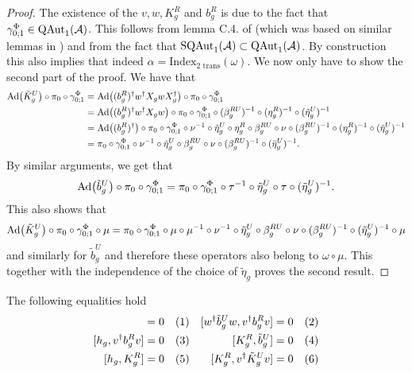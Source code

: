 \documentclass[11pt,a4paper,twoside]{article}
\numberwithin{equation}{section}
\begin{document}
	\begin{proof}
		The existence of the $v,w,K_g^R$ and $b_g^R$ is due to the fact that $\gamma^\Phi_{0;1}\in \QAut{\AA}$. This follows from lemma C.4. of \cite{jappens2023spt} (which was based on similar lemmas in \cite{ogata2021h3gmathbb}) and from the fact that $\textrm{SQAut}_1(\AA)\subset \QAut{\AA}$. By construction this also implies that indeed $\alpha=\textrm{Index}_{\text{2 trans}}(\omega)$. We now only have to show the second part of the proof. We have that
		\begin{align}
			\Ad{\tilde{K}_g^U}\circ\pi_0\circ\gamma^\Phi_{0;1}&=\Ad{(b_g^R)^\dagger w^\dagger X_g w X_g^\dagger}\circ\pi_0\circ\gamma^\Phi_{0;1}\\
			&=\Ad{(b_g^R)^\dagger w^\dagger X_g w}\circ\pi_0\circ\gamma^\Phi_{0;1}\circ(\beta_g^{RU})^{-1}\circ(\eta_g^R)^{-1}\circ(\tilde{\eta}_g^U)^{-1}\\
			&=\Ad{(b_g^R)^\dagger}\circ\pi_0\circ\gamma^\Phi_{0;1}\circ\nu^{-1}\circ\tilde{\eta}_g^U\circ\eta_g^R\circ\beta_g^{RU}\circ\nu\circ(\beta_g^{RU})^{-1}\circ(\eta_g^R)^{-1}\circ(\tilde{\eta}_g^U)^{-1}\\
			&=\pi_0\circ\gamma^\Phi_{0;1}\circ\nu^{-1}\circ\tilde{\eta}_g^U\circ\beta_g^{RU}\circ\nu\circ(\beta_g^{RU})^{-1}\circ(\tilde{\eta}_g^U)^{-1}.
		\end{align}
		By similar arguments, we get that
		\begin{equation}
			\Ad{\tilde{b}_g^U}\circ\pi_0\circ\gamma^\Phi_{0;1}=\pi_0\circ\gamma^\Phi_{0;1}\circ\tau^{-1}\circ\tilde{\eta}_g^U\circ\tau\circ(\tilde{\eta}_g^U)^{-1}.
		\end{equation}
		This also shows that
		\begin{equation}
			\Ad{\tilde{K}_g^U}\circ\pi_0\circ\gamma^\Phi_{0;1}\circ\mu=\pi_0\circ\gamma^\Phi_{0;1}\circ\mu\circ\mu^{-1}\circ\nu^{-1}\circ\tilde{\eta}_g^U\circ\beta_g^{RU}\circ\nu\circ(\beta_g^{RU})^{-1}\circ(\tilde{\eta}_g^U)^{-1}\circ\mu
		\end{equation}
		and similarly for $\tilde{b}_g^U$ and therefore these operators also belong to $\omega\circ\mu$. This together with the independence of the choice of $\tilde{\eta}_g$ proves the second result.
	\end{proof}
	\begin{lemma}
		The following equalities hold
		\begin{align*}
			[h_g ,w^\dagger \tilde{b}_g^U w]&=0 \Label{eq:H^1IndexRotationInvariantCommutator1}& [w^\dagger \tilde{b}_g^U w,v^\dagger b_g^R v]&=0 \Label{eq:H^1IndexRotationInvariantCommutator4}\\
			[h_g, v^\dagger b_g^R v]&=0 \Label{eq:H^1IndexRotationInvariantCommutator2}& [K_g^R,\tilde{b}_g^U] &= 0 \Label{eq:H^1IndexRotationInvariantCommutator5}\\
			[h_g ,K_g^R]&=0 \Label{eq:H^1IndexRotationInvariantCommutator3}& [K_g^R,v^\dagger \tilde{K}^U_g v] &= 0 \Label{eq:H^1IndexRotationInvariantCommutator6}
		\end{align*}
	\end{lemma}
\end{document}

